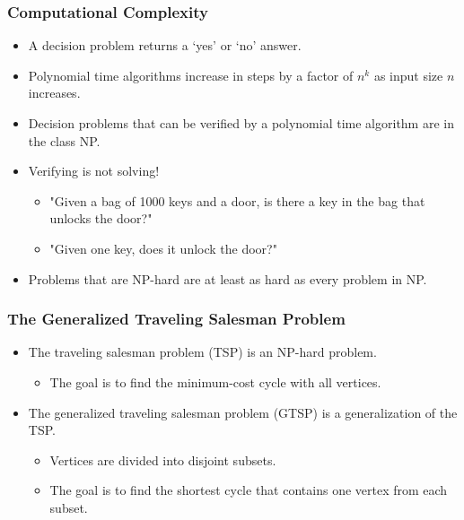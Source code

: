 \documentclass{beamer}
\begin{document}
\begin{frame}
\frametitle{Computational Complexity}
\begin{itemize}
	\item A decision problem returns a `yes' or `no' answer. 
	\item Polynomial time algorithms increase in steps by a factor of $n^k$ as input size $n$ increases. 
	\item Decision problems that can be verified by a polynomial time algorithm are in the class NP. 
	\item Verifying is not solving! 
	\begin{itemize}
		\item "Given a bag of 1000 keys and a door, is there a key in the bag that unlocks the door?"
		\item "Given one key, does it unlock the  door?"
	\end{itemize}
	\item Problems that are NP-hard are at least as hard as every problem in NP. 
\end{itemize}


\end{frame}

\begin{frame}
\frametitle{The Generalized Traveling Salesman Problem}
\begin{itemize}
	\item The traveling salesman problem (TSP) is an NP-hard problem. 
	\begin{itemize}
		\item The goal is to find the minimum-cost cycle with all vertices. 
	\end{itemize}	
	\item The generalized traveling salesman problem (GTSP) is a generalization of the TSP. 
	\begin{itemize}
		\item Vertices are divided into disjoint subsets.
		\item The goal is to find the shortest cycle that contains one vertex from each subset.
	\end{itemize}
\end{itemize}

\end{frame}
\end{document}
